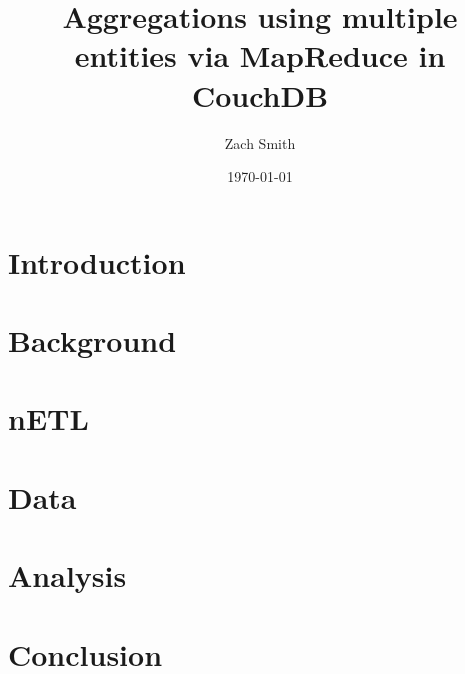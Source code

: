 \documentclass[
    parskip=full,
    a4paper
]{report}
\title{Aggregations using multiple entities via MapReduce in CouchDB}
\author{Zach Smith}
\date{\today}
\begin{document}
\maketitle
\thispagestyle{empty}

\begin{abstract}
    
\end{abstract}
\newpage

\tableofcontents
\newpage

\chapter{Introduction}


\chapter{Background}





\chapter{nETL}






\chapter{Data}







\chapter{Analysis}






\chapter{Conclusion}




\newpage
\end{document}
